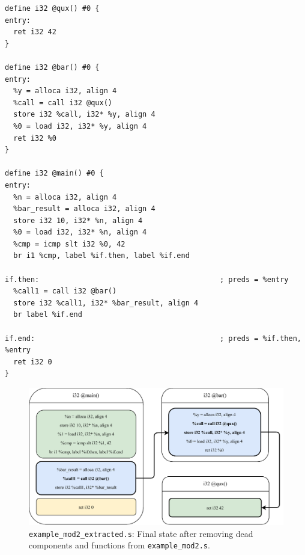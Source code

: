 \documentclass[12pt, twoside]{fithesis2}
\renewcommand{\_}{\leavevmode \kern0.07em\vbox{\hrule width0.4em}}
\begin{document}

\begin{verbatim}
define i32 @qux() #0 {
entry:
  ret i32 42
}

define i32 @bar() #0 {
entry:
  %y = alloca i32, align 4
  %call = call i32 @qux()
  store i32 %call, i32* %y, align 4
  %0 = load i32, i32* %y, align 4
  ret i32 %0
}

define i32 @main() #0 {
entry:
  %n = alloca i32, align 4
  %bar_result = alloca i32, align 4
  store i32 10, i32* %n, align 4
  %0 = load i32, i32* %n, align 4
  %cmp = icmp slt i32 %0, 42
  br i1 %cmp, label %if.then, label %if.end

if.then:                                          ; preds = %entry
  %call1 = call i32 @bar()
  store i32 %call1, i32* %bar_result, align 4
  br label %if.end

if.end:                                           ; preds = %if.then, %entry
  ret i32 0
}
\end{verbatim}

\begin{figure}[ht]
    \centering
    \includegraphics[]{images/example_mod2/example_mod2_removing_done.pdf}
    \caption{
    \texttt{example_mod2_extracted.s}:
    Final state after removing dead components and functions from
    \texttt{example_mod2.s}.
    }
    \label{fig:mod2_done}
\end{figure}
\end{document}
